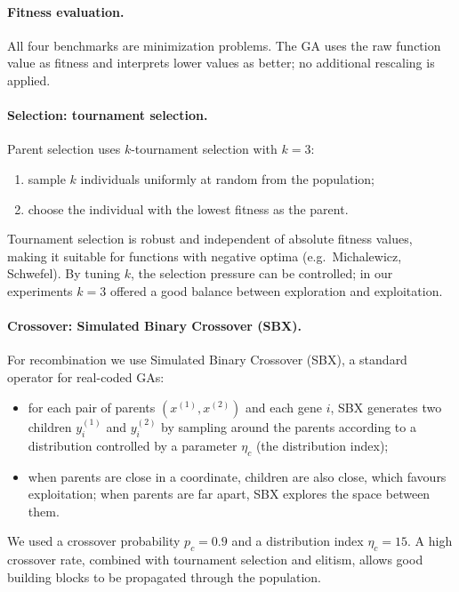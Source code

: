 \documentclass[11pt]{article}
\begin{document}
\paragraph{Fitness evaluation.}
All four benchmarks are minimization problems.
The GA uses the raw function value as fitness and interprets lower values
as better; no additional rescaling is applied.

\paragraph{Selection: tournament selection.}
Parent selection uses $k$-tournament selection with $k = 3$:
\begin{enumerate}
  \item sample $k$ individuals uniformly at random from the population;
  \item choose the individual with the lowest fitness as the parent.
\end{enumerate}
Tournament selection is robust and independent of absolute fitness values,
making it suitable for functions with negative optima (e.g.\ Michalewicz,
Schwefel).
By tuning $k$, the selection pressure can be controlled; in our experiments
$k = 3$ offered a good balance between exploration and exploitation.

\paragraph{Crossover: Simulated Binary Crossover (SBX).}
For recombination we use Simulated Binary Crossover (SBX), a standard
operator for real-coded GAs:
\begin{itemize}
  \item for each pair of parents $(x^{(1)}, x^{(2)})$ and each gene $i$,
        SBX generates two children $y^{(1)}_i$ and $y^{(2)}_i$ by sampling
        around the parents according to a distribution controlled by a
        parameter $\eta_c$ (the distribution index);
  \item when parents are close in a coordinate, children are also close,
        which favours exploitation; when parents are far apart, SBX explores
        the space between them.
\end{itemize}
We used a crossover probability $p_c = 0.9$ and a distribution index
$\eta_c = 15$.
A high crossover rate, combined with tournament selection and elitism, allows
good building blocks to be propagated through the population.
\end{document}
